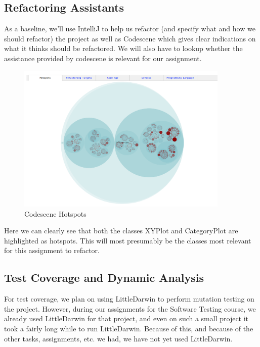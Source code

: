 \documentclass{article}
\begin{document}
\newpage
\subsection{Refactoring Assistants}

As a baseline, we'll use IntelliJ to help us refactor (and specify what and how we should refactor) the project as well as Codescene which gives clear indications on what it thinks should be refactored. We will also have to lookup whether the assistance provided by codescene is relevant for our assignment.

\begin{figure}[H]
\centering
	\includegraphics[width=0.9\textwidth]{codescene_hotspots.png}
	\caption{Codescene Hotspots}
\end{figure}

Here we can clearly see that both the classes XYPlot and CategoryPlot are highlighted as hotspots. This will most presumably be the classes most relevant for this assignment to refactor.

\newpage
\subsection{Test Coverage and Dynamic Analysis}

For test coverage, we plan on using LittleDarwin to perform mutation testing on the project. However, during our assignments for the Software Testing course, we already used LittleDarwin for that project, and even on such a small project it took a fairly long while to run LittleDarwin. Because of this, and because of the other tasks, assignments, etc. we had, we have not yet used LittleDarwin.\\
\end{document}
